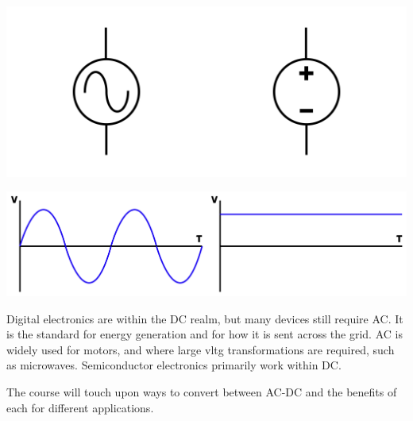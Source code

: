\documentclass[a4paper,11pt]{report}
\begin{document}
\includegraphics[width=0.5\textwidth]{acsource1}\includegraphics[width=0.5\textwidth]{dcsource1}

\includegraphics[width=0.5\textwidth]{acwave}\includegraphics[width=0.5\textwidth]{dcwave}

Digital electronics are within the DC realm, but many devices still require AC. It is the standard for energy generation and for how it is sent across the grid. AC is widely used for motors, and where large \gls{vltg} transformations are required, such as microwaves. Semiconductor electronics primarily work within DC.

The course will touch upon ways to convert between AC-DC and the benefits of each for different applications.
\end{document}

